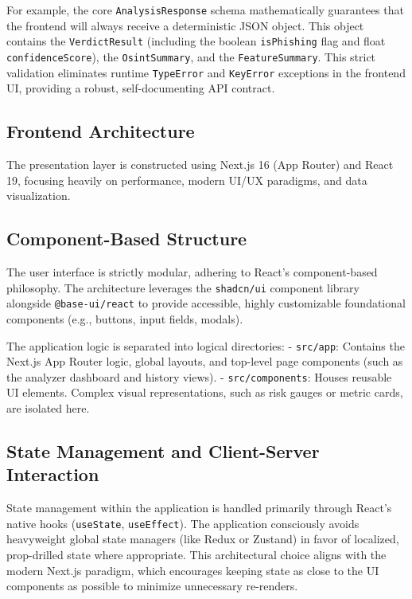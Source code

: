 For example, the core \texttt{AnalysisResponse} schema mathematically
guarantees that the frontend will always receive a deterministic JSON
object. This object contains the \texttt{VerdictResult} (including the
boolean \texttt{isPhishing} flag and float \texttt{confidenceScore}),
the \texttt{OsintSummary}, and the \texttt{FeatureSummary}. This strict
validation eliminates runtime \texttt{TypeError} and \texttt{KeyError}
exceptions in the frontend UI, providing a robust, self-documenting API
contract.

\subsection{Frontend Architecture}\label{frontend-architecture}

The presentation layer is constructed using Next.js 16 (App Router) and
React 19, focusing heavily on performance, modern UI/UX paradigms, and
data visualization.

\subsection{Component-Based
Structure}\label{component-based-structure}

The user interface is strictly modular, adhering to React's
component-based philosophy. The architecture leverages the
\texttt{shadcn/ui} component library alongside \texttt{@base-ui/react}
to provide accessible, highly customizable foundational components
(e.g., buttons, input fields, modals).

The application logic is separated into logical directories: -
\texttt{src/app}: Contains the Next.js App Router logic, global layouts,
and top-level page components (such as the analyzer dashboard and
history views). - \texttt{src/components}: Houses reusable UI elements.
Complex visual representations, such as risk gauges or metric cards, are
isolated here.

\subsection{State Management and Client-Server
Interaction}\label{state-management-and-client-server-interaction}

State management within the application is handled primarily through
React's native hooks (\texttt{useState}, \texttt{useEffect}). The
application consciously avoids heavyweight global state managers (like
Redux or Zustand) in favor of localized, prop-drilled state where
appropriate. This architectural choice aligns with the modern Next.js
paradigm, which encourages keeping state as close to the UI components
as possible to minimize unnecessary re-renders.

